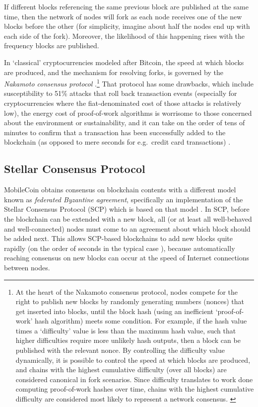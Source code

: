 If different blocks referencing the same previous block are published at the same time, then the network of nodes will fork as each node receives one of the new blocks before the other (for simplicity, imagine about half the nodes end up with each side of the fork). Moreover, the likelihood of this happening rises with the frequency blocks are published.

In `classical' cryptocurrencies modeled after Bitcoin, the speed at which blocks are produced, and the mechanism for resolving forks, is governed by the {\em Nakamoto consensus protocol} \cite{Nakamoto_bitcoin}.\footnote{At the heart of the Nakamoto consensus protocol, nodes compete for the right to publish new blocks by randomly generating numbers (nonces) that get inserted into blocks, until the block hash (using an inefficient `proof-of-work' hash algorithm) meets some condition. For example, if the hash value times a `difficulty' value is less than the maximum hash value, such that higher difficulties require more unlikely hash outputs, then a block can be published with the relevant nonce. By controlling the difficulty value dynamically, it is possible to control the speed at which blocks are produced, and chains with the highest cumulative difficulty (over all blocks) are considered canonical in fork scenarios. Since difficulty translates to work done computing proof-of-work hashes over time, chains with the highest cumulative difficulty are considered most likely to represent a network consensus. \cite{ztm-2}} That protocol has some drawbacks, which include susceptibility to 51\% attacks that roll back transaction events (especially for cryptocurrencies where the fiat-denominated cost of those attacks is relatively low), the energy cost of proof-of-work algorithms is worrisome to those concerned about the environment or sustainability, and it can take on the order of tens of minutes to confirm that a transaction has been successfully added to the blockchain (as opposed to mere seconds for e.g.\ credit card transactions) \cite{fast-secure-global-payments-stellar}.


\subsection{Stellar Consensus Protocol}
\label{subsec:blockchain-stellar-consensus-protocol}

MobileCoin obtains consensus on blockchain contents with a different model known as {\em federated Byzantine agreement}, specifically an implementation of the Stellar Consensus Protocol (SCP) which is based on that model \cite{stellar-consensus-protocol}. In SCP, before the blockchain can be extended with a new block, all (or at least all well-behaved and well-connected) nodes must come to an agreement about which block should be added next. This allows SCP-based blockchains to add new blocks quite rapidly (on the order of seconds in the typical case \cite{fast-secure-global-payments-stellar}), because automatically reaching consensus on new blocks can occur at the speed of Internet connections between nodes.

